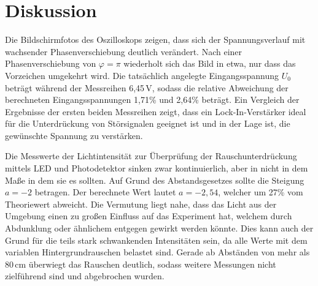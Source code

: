 \section{Diskussion}
\label{sec:Diskussion}
Die Bildschirmfotos des Oszilloskops zeigen, dass sich der Spannungsverlauf mit wachsender
Phasenverschiebung deutlich verändert. Nach einer Phasenverschiebung von  $\varphi = \pi$
wiederholt sich das Bild in etwa, nur dass das Vorzeichen umgekehrt wird.
Die tatsächlich angelegte Eingangsspannung $U_\text{0}$
beträgt während der Messreihen 6,45\,V, sodass die relative Abweichung der berechneten
Eingangsspannungen 1,71\% und 2,64\% beträgt. Ein Vergleich der Ergebnisse der ersten beiden Messreihen zeigt, dass ein 
Lock-In-Verstärker ideal für die Unterdrückung von Störsignalen geeignet ist und in der Lage ist,
die gewünschte Spannung zu verstärken.

Die Messwerte der Lichtintensität zur Überprüfung der Rauschunterdrückung mittels LED und Photodetektor sinken
zwar kontinuierlich, aber in nicht in dem Maße in dem sie es sollten. Auf Grund des Abstandsgesetzes sollte die Steigung $a = -2$ betragen.
Der berechnete Wert lautet $a = -2,54$, welcher um 27\% vom Theoriewert abweicht. Die Vermutung liegt nahe,
dass das Licht aus der Umgebung einen zu großen Einfluss auf das Experiment hat, welchem durch
Abdunklung oder ähnlichem entgegen gewirkt werden könnte. Dies kann auch der Grund für die teils
stark schwankenden Intensitäten sein, da alle Werte mit dem variablen Hintergrundrauschen belastet sind.
Gerade ab Abständen von mehr als 80\,cm überwiegt das Rauschen deutlich, sodass weitere Messungen
nicht zielführend sind und abgebrochen wurden.